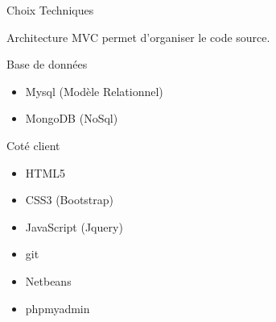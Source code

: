 \documentclass[french]{beamer}
\begin{document}
\begin{frame}{Choix Techniques}
\transblindshorizontal<1>[duration=1]	

\begin{exampleblock}{Architecture}
	MVC permet d'organiser le code source.

\end{exampleblock}


\begin{exampleblock}{Base de données}

	\begin{itemize}
	\item Mysql (Modèle Relationnel)
	\item MongoDB (NoSql)
	\end{itemize}
	

\end{exampleblock}

\begin{exampleblock}{Coté client}
	\begin{itemize}
	\item HTML5
	\item CSS3 (Bootstrap)
	\item JavaScript (Jquery)
	\end{itemize}

\end{exampleblock}

\begin{exampleblock}{}
\begin{itemize}
\item git
\item Netbeans
\item phpmyadmin
  
\end{itemize}
\end{exampleblock}

\end{frame}
\end{document}
